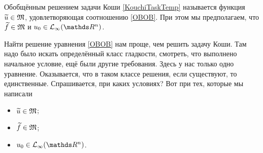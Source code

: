 \begin{Def}
  Обобщённым решением задачи Коши \eqref{KouchiTaskTemp} называется функция $\widetilde{u}{}\in\mathfrak M$, удовлетворяющая соотношению \eqref{OBOB}.
При этом мы предполагаем, что $\widetilde{f}{}\in\mathfrak M$ и $u_0\in\L_\infty(\R^n)$.
\end{Def}
Найти решение уравнения \eqref{OBOB} нам проще, чем решить задачу Коши. Там надо было искать определённый класс гладкости, смотреть, что выполнено начальное условие, ещё были другие требования. Здесь у нас только одно уравнение. Оказывается, что в таком классе решения, если существуют, то единственные. Спрашивается, при каких условиях? Вот при тех, которые мы написали
\begin{itemize}
\item $\widetilde{u}{}\in\mathfrak M$;
\item $\widetilde{f}{}\in\mathfrak M$;
\item $u_0\in\L_\infty(\R^n)$.
\end{itemize}

